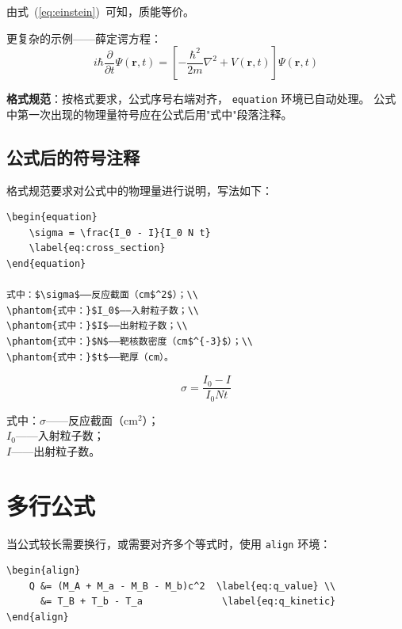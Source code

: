 由式~(\ref{eq:einstein})~可知，质能等价。

更复杂的示例——薛定谔方程：
\begin{equation}
    i\hbar \frac{\partial}{\partial t} \Psi(\mathbf{r}, t)
    = \left[ -\frac{\hbar^2}{2m} \nabla^2 + V(\mathbf{r}, t) \right] \Psi(\mathbf{r}, t)
    \label{eq:schrodinger}
\end{equation}

\textbf{格式规范}：按格式要求，公式序号右端对齐，
\texttt{equation} 环境已自动处理。
公式中第一次出现的物理量符号应在公式后用"式中"段落注释。

\subsection{公式后的符号注释}

格式规范要求对公式中的物理量进行说明，写法如下：

\begin{verbatim}
\begin{equation}
    \sigma = \frac{I_0 - I}{I_0 N t}
    \label{eq:cross_section}
\end{equation}

式中：$\sigma$——反应截面（cm$^2$）；\\
\phantom{式中：}$I_0$——入射粒子数；\\
\phantom{式中：}$I$——出射粒子数；\\
\phantom{式中：}$N$——靶核数密度（cm$^{-3}$）；\\
\phantom{式中：}$t$——靶厚（cm）。
\end{verbatim}

\begin{equation}
    \sigma = \frac{I_0 - I}{I_0 N t}
    \label{eq:cross_section}
\end{equation}

式中：$\sigma$——反应截面（cm$^2$）；\\
\phantom{式中：}$I_0$——入射粒子数；\\
\phantom{式中：}$I$——出射粒子数。

\section{多行公式}

当公式较长需要换行，或需要对齐多个等式时，使用 \texttt{align} 环境：

\begin{verbatim}
\begin{align}
    Q &= (M_A + M_a - M_B - M_b)c^2  \label{eq:q_value} \\
      &= T_B + T_b - T_a              \label{eq:q_kinetic}
\end{align}
\end{verbatim}

